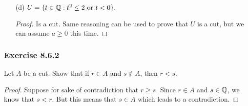 \begin{enumerate}
\begin{proof}[Solution]
        Next, we show (C2). Let \( r \in T  \). Then by definition of \( T  \), we must have either \( r^{2} < 2  \) or \( r < 0  \). If \( r < 0  \), then we can easily pick \(  q < r  \) for any \( q < 0  \). Otherwise, we have \( r^{2} < 2  \) such that if we let \( q \in \Q  \) be arbitrary with \( q^{2} < r^{2}  \). Then we easily have \( q < r  \).

        Finally, we show (C3). Let \( r \in T  \). Then either we have \( r^{2} < 2  \) or \( r < 0  \). Consider 
        \begin{align*}
           \Big( r + \frac{ 1 }{ n }  \Big)^{2} &= r^{2} + \frac{ 2r }{ n }  + \frac{ 1 }{ n }  \\
                                                &= r^{2} +  \frac{ 2r + 1  }{ n  }.  \\
        \end{align*}
        Let us set \( s = r + \frac{ 1 }{ n_{0} }   \). If \( r > 0  \), then we can pick an \( n_{0}  \) large enough such that 
        \[ \frac{ 1 }{ n_{0}  }  < \frac{ 4 - r^{2}  }{ 2r+1  }.   \]
        Then we have 
        \[  \Big( r + \frac{ 1 }{ n_{0} }  \Big)^{2} < r^{2} + \frac{ 2r+1 }{ n_{0} } < r^{2} + \frac{ 2r+1 }{ n_{0}  }  \cdot \frac{ 4 - r^{2} }{ 2r+1 } < 4. \]
        Hence, we have \( r < s < 2   \). Otherwise, we choose \( n_{0 }  \) large enough so that 
        \[  \frac{ 1 }{ n_{0}  }  < \frac{ -r^{2} }{  2r+1 }. \] Then we have 
        \[  \Big( r + \frac{ 1 }{ n_{0} }  \Big)^{2} < r^{2} + \frac{ 2r+1 }{ n_{0} }  < 0. \]
         This implies that \( r < s < 0  \). 
     \end{proof}


    \item[(d)] \( U = \{ t \in \mathbb{Q} : t^{2} \leq 2 \ \text{or} \ t < 0  \}.  \)
            \begin{proof}
            Is a cut. Same reasoning can be used to prove that \( U  \) is a cut, but we can assume \( a \geq 0  \) this time.
            \end{proof}
\end{enumerate}





\subsubsection{Exercise 8.6.2} 
Let \( A  \) be a cut. Show that if \( r \in  A \) and \( s \notin A  \), then \( r < s  \).
\begin{proof}
Suppose for sake of contradiction that \( r \geq s  \). Since \( r \in A  \) and \( s \in \mathbb{Q}  \), we know that \( s < r   \). But this means that \( s \in A  \) which leads to a contradiction.
\end{proof}

